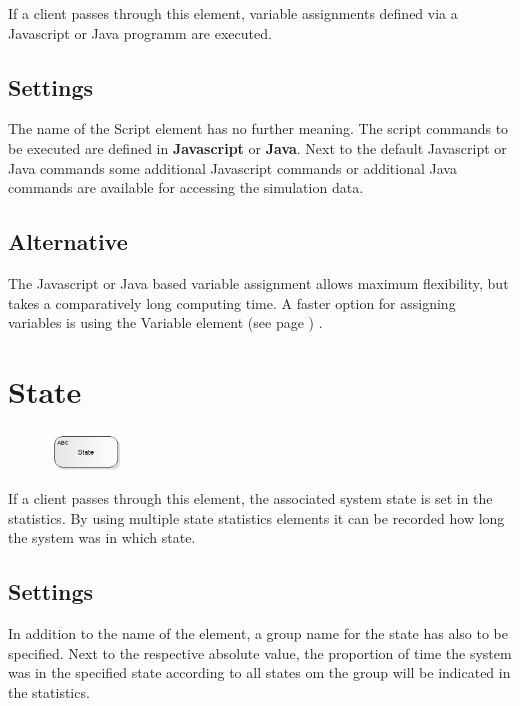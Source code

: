 If a client passes through this element, variable assignments defined via
a Javascript or Java programm are executed.

\subsection*{Settings}

The name of the Script element has no further meaning.
The script commands to be executed are defined in \textbf{Javascript} or \textbf{Java}.
Next to the default Javascript or Java commands some additional Javascript commands 
or additional Java commands are available for accessing the simulation data.

\subsection*{Alternative}

The Javascript or Java based variable assignment allows maximum flexibility, but takes a comparatively long
computing time. A faster option for assigning variables is using the
Variable element (see page \pageref{ref:ModelElementSet}) .


\section{State}
\label{ref:ModelElementStateStatistics}

\begin{figure}
\vspace{-22pt}
\includegraphics[width=2cm]{imageModelElementStateStatistics.png}
\vspace{-22pt}
\end{figure}

If a client passes through this element, the associated system state is set in the statistics.
By using multiple state statistics elements it can be recorded how long the system
was in which state.

\subsection*{Settings}

In addition to the name of the element, a group name for the state has also to be specified.
Next to the respective absolute value, the proportion of time the system was in the specified
state according to all states om the group will be indicated in the statistics.


